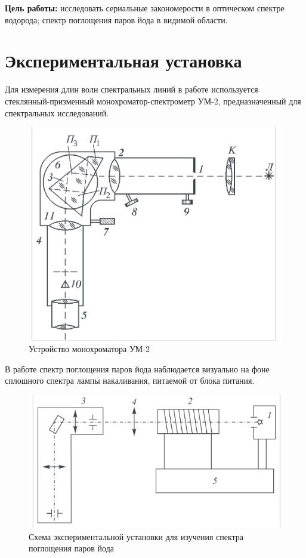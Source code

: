 



	


	\textbf{Цель работы:} исследовать сериальные закономерости в оптическом спектре водорода; спектр поглощения паров йода в видимой области.
	
    
       
        \section{Экспериментальная установка}
        Для измерения длин волн спектральных линий в работе используется стеклянный-призменный монохроматор-спектрометр УМ-2, предназначенный для спектральных исследований.
        

        \begin{figure}[h!]
            \centering
            \includegraphics[width=0.6\linewidth]{pics/scheme1.png}
            \caption{Устройство монохроматора УМ-2}
            \label{scheme1}
        \end{figure} 
        
        В работе спектр поглощения паров йода наблюдается визуально на фоне сплошного спектра лампы накаливания, питаемой от блока питания.
        
        
        \begin{figure}[h!]
            \centering
            \includegraphics[width=0.6\linewidth]{pics/scheme2.png}
            \caption{Схема экспериментальной установки для изучения спектра поглощения паров йода}
            \label{scheme2}
        \end{figure} 
        
